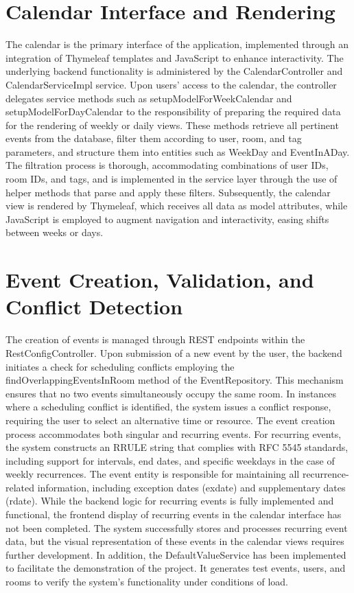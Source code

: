 \section{Calendar Interface and Rendering}\label{sec:calendar-interface-and-rendering}
The calendar is the primary interface of the application, implemented through an integration of Thymeleaf templates and JavaScript to enhance interactivity.
The underlying backend functionality is administered by the CalendarController and CalendarServiceImpl service.
Upon users' access to the calendar, the controller delegates service methods such as setupModelForWeekCalendar and setupModelForDayCalendar to the responsibility of preparing the required data for the rendering of weekly or daily views.
These methods retrieve all pertinent events from the database, filter them according to user, room, and tag parameters, and structure them into entities such as WeekDay and EventInADay.
The filtration process is thorough, accommodating combinations of user IDs, room IDs, and tags, and is implemented in the service layer through the use of helper methods that parse and apply these filters.
Subsequently, the calendar view is rendered by Thymeleaf, which receives all data as model attributes, while JavaScript is employed to augment navigation and interactivity, easing shifts between weeks or days.


\section{Event Creation, Validation, and Conflict Detection}\label{sec:event-creation-validation-and-conflict-detection}
The creation of events is managed through REST endpoints within the RestConfigController.
Upon submission of a new event by the user, the backend initiates a check for scheduling conflicts employing the findOverlappingEventsInRoom method of the EventRepository.
This mechanism ensures that no two events simultaneously occupy the same room.
In instances where a scheduling conflict is identified, the system issues a conflict response, requiring the user to select an alternative time or resource.
The event creation process accommodates both singular and recurring events.
For recurring events, the system constructs an RRULE string that complies with RFC 5545 standards, including support for intervals, end dates, and specific weekdays in the case of weekly recurrences.
The event entity is responsible for maintaining all recurrence-related information, including exception dates (exdate) and supplementary dates (rdate).
While the backend logic for recurring events is fully implemented and functional, the frontend display of recurring events in the calendar interface has not been completed.
The system successfully stores and processes recurring event data, but the visual representation of these events in the calendar views requires further development.
In addition, the DefaultValueService has been implemented to facilitate the demonstration of the project.
It generates test events, users, and rooms to verify the system's functionality under conditions of load.


